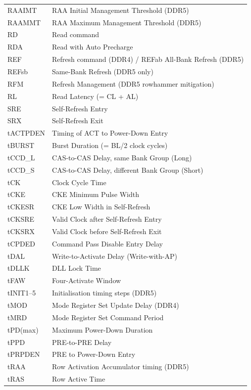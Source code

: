 \documentclass[11pt,a4paper]{article}
\begin{document}
\begin{longtable}{L{2.2cm} p{12cm}}
RAAIMT & RAA Initial Management Threshold (DDR5) \\
RAAMMT & RAA Maximum Management Threshold (DDR5) \\
RD    & Read command \\
RDA   & Read with Auto Precharge \\
REF   & Refresh command (DDR4) / REFab All-Bank Refresh (DDR5) \\
REFsb & Same-Bank Refresh (DDR5 only) \\
RFM   & Refresh Management (DDR5 rowhammer mitigation) \\
RL    & Read Latency (= CL + AL) \\
SRE   & Self-Refresh Entry \\
SRX   & Self-Refresh Exit \\
tACTPDEN & Timing of ACT to Power-Down Entry \\
tBURST   & Burst Duration (= BL/2 clock cycles) \\
tCCD\_L  & CAS-to-CAS Delay, same Bank Group (Long) \\
tCCD\_S  & CAS-to-CAS Delay, different Bank Group (Short) \\
tCK      & Clock Cycle Time \\
tCKE     & CKE Minimum Pulse Width \\
tCKESR   & CKE Low Width in Self-Refresh \\
tCKSRE   & Valid Clock after Self-Refresh Entry \\
tCKSRX   & Valid Clock before Self-Refresh Exit \\
tCPDED   & Command Pass Disable Entry Delay \\
tDAL     & Write-to-Activate Delay (Write-with-AP) \\
tDLLK    & DLL Lock Time \\
tFAW     & Four-Activate Window \\
tINIT1--5 & Initialisation timing steps (DDR5) \\
tMOD     & Mode Register Set Update Delay (DDR4) \\
tMRD     & Mode Register Set Command Period \\
tPD(max) & Maximum Power-Down Duration \\
tPPD     & PRE-to-PRE Delay \\
tPRPDEN  & PRE to Power-Down Entry \\
tRAA     & Row Activation Accumulator timing (DDR5) \\
tRAS     & Row Active Time \\

\end{longtable}
\end{document}
